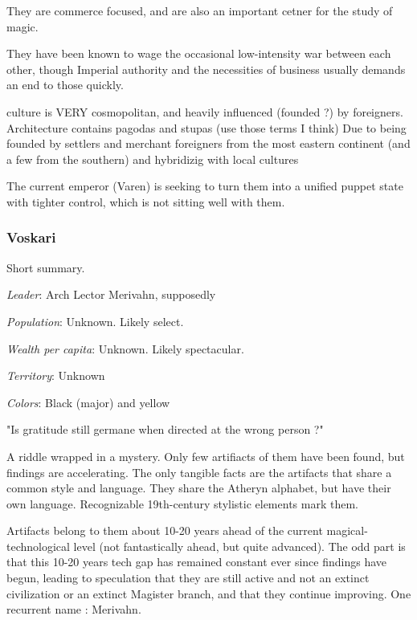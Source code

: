They are commerce focused, and are also an important cetner for the study of magic.

They have been known to wage the occasional low-intensity war between each other, though Imperial authority and the necessities of business usually demands an end to those quickly.

culture is  VERY cosmopolitan, and heavily influenced (founded ?) by foreigners. Architecture contains pagodas and stupas (use those terms I think) Due to being founded by settlers and merchant foreigners from the most eastern continent (and a few from the southern) and hybridizig with local cultures


The current emperor (Varen) is seeking to turn them into a unified puppet state with tighter control, which is not sitting well with them.

	

\subsubsection{Voskari}

Short summary.


\textit{Leader}: Arch Lector Merivahn, supposedly

\textit{Population}: Unknown. Likely select.

\textit{Wealth per capita}: Unknown. Likely spectacular.

\textit{Territory}: Unknown
    
\textit{Colors}: Black (major) and yellow


\begin{rpg-quotebox}
	"Is gratitude still germane when directed at the wrong person ?"
\end{rpg-quotebox}

A riddle wrapped in a mystery. Only few artifiacts of them have been found, but findings are accelerating. The only tangible facts are the artifacts that share a common style and language. They share the Atheryn alphabet, but have their own language. Recognizable 19th-century stylistic elements mark them.

Artifacts belong to them about 10-20 years ahead of the current magical-technological level (not fantastically ahead, but quite advanced). The odd part is that this 10-20 years tech gap has remained constant ever since findings have begun, leading to speculation that they are still active and not an extinct civilization or an extinct Magister branch, and that they continue improving. One recurrent name : Merivahn.


